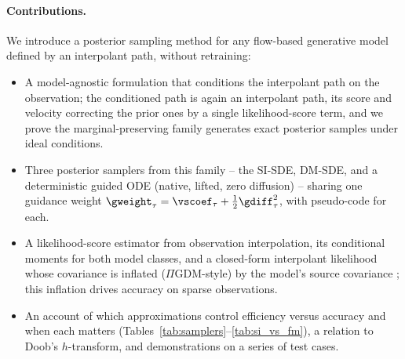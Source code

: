 

\paragraph{Contributions.}
We introduce a posterior sampling method for any flow-based generative model defined by an interpolant path, without retraining:
\begin{itemize}
    \item A model-agnostic formulation that conditions the interpolant path on the observation; the conditioned path is again an interpolant path, its score and velocity correcting the prior ones by a single likelihood-score term, and we prove the marginal-preserving family generates exact posterior samples under ideal conditions.
    \item Three posterior samplers from this family -- the SI-SDE, DM-SDE, and a deterministic guided ODE (native, lifted, zero diffusion) -- sharing one guidance weight $\gweight_\tau=\vscoef_\tau+\tfrac12\gdiff_\tau^2$, with pseudo-code for each.
    \item A likelihood-score estimator from observation interpolation, its conditional moments for both model classes, and a closed-form interpolant likelihood whose covariance is inflated ($\Pi$GDM-style) by the model's source covariance \cite{chung_diffusion_2023, song_pseudoinverse_2023}; this inflation drives accuracy on sparse observations.
    \item An account of which approximations control efficiency versus accuracy and when each matters (Tables~\ref{tab:samplers}--\ref{tab:si_vs_fm}), a relation to Doob's $h$-transform, and demonstrations on a series of test cases.
\end{itemize}